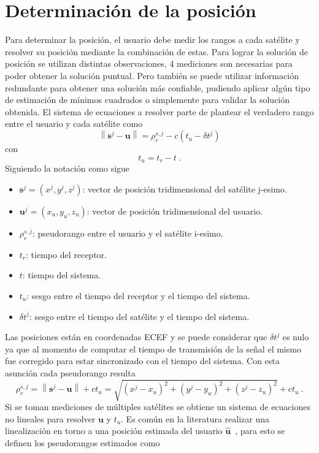 \documentclass[a4paper,12pt,oneside,onecolumn,final,openright]{book}%
\begin{document}
\section{Determinación de la posición}
	Para determinar la posición, el usuario debe medir los rangos a cada satélite y resolver su posición mediante la combinación de estas. Para lograr la solución de posición se utilizan distintas observaciones, 4 mediciones son necesarias para poder obtener la solución puntual. Pero también se puede utilizar información redundante para obtener una solución más confiable, pudiendo aplicar algún tipo de estimación de mínimos cuadrados o simplemente para validar la solución obtenida. El sistema de ecuaciones a resolver parte de plantear el verdadero rango entre el usuario y cada satélite como 
\begin{equation}
	\left \lVert \mathbf{s}^j - \mathbf{u} \right \rVert = \rho_r^{s,j} - c(t_u-\delta t^j)
\end{equation}
	con 
\begin{equation}
	t_u = t_r - t \ .
\end{equation}
	Siguiendo la notación como sigue
\begin{itemize}
  \item[] $\mathbf{s}^j = (x^j,y^j,z^j)$: vector de posición tridimensional del satélite j-esimo.
  \item[] $\mathbf{u}^j = (x_u,y_u,z_u)$: vector de posición tridimensional del usuario.
  \item[] $\rho_r^{s,j}$: pseudorango entre el usuario y el satélite i-esimo.
  \item[] $t_r$: tiempo del receptor.
  \item[] $t$: tiempo del sistema.
  \item[] $t_u$: sesgo entre el tiempo del receptor y el tiempo del sistema.
  \item[] $\delta t^j$: sesgo entre el tiempo del satélite y el tiempo del sistema.
\end{itemize}
	Las posiciones están en coordenadas ECEF y se puede considerar que $\delta t^j$ es nulo ya que al momento de computar el tiempo de transmisión de la señal el mismo fue corregido para estar sincronizado con el tiempo del sistema. Con esta asunción cada pseudorango resulta
\begin{equation}
	\rho_r^{s,j} = \left \lVert \mathbf{s}^j - \mathbf{u} \right \rVert + ct_u = \sqrt{(x^j-x_u)^2+(y^j-y_u)^2+(z^j-z_u)^2} + ct_u \ .
\end{equation} 
	Si se toman mediciones de múltiples satélites se obtiene un sistema de ecuaciones no lineales para resolver $\mathbf{u}$ y $t_u$. Es común en la literatura realizar una linealización en torno a una posición estimada del usuario $\hat{\mathbf{u}}$~\cite{kaplan}, para esto se definen los pseudorangos estimados como
\end{document}
